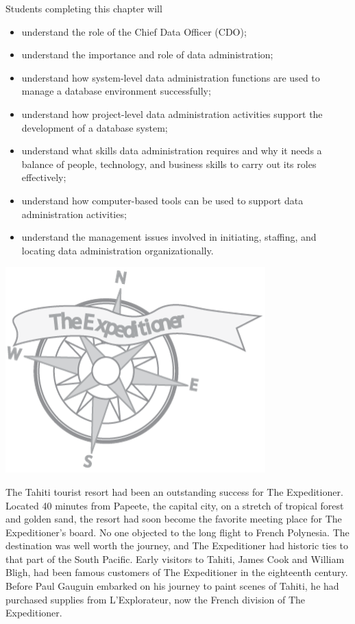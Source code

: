 \documentclass[
]{article}
\begin{document}
Students completing this chapter will

\begin{itemize}
\item
  understand the role of the Chief Data Officer (CDO);
\item
  understand the importance and role of data administration;
\item
  understand how system-level data administration functions are used
  to manage a database environment successfully;
\item
  understand how project-level data administration activities support
  the development of a database system;
\item
  understand what skills data administration requires and why it needs
  a balance of people, technology, and business skills to carry out
  its roles effectively;
\item
  understand how computer-based tools can be used to support data
  administration activities;
\item
  understand the management issues involved in initiating, staffing,
  and locating data administration organizationally.
\end{itemize}

\includegraphics{Figures/Chapter 1/expeditioner.png}

The Tahiti tourist resort had been an outstanding success for The
Expeditioner. Located 40 minutes from Papeete, the capital city, on a
stretch of tropical forest and golden sand, the resort had soon become
the favorite meeting place for The Expeditioner's board. No one objected
to the long flight to French Polynesia. The destination was well worth
the journey, and The Expeditioner had historic ties to that part of the
South Pacific. Early visitors to Tahiti, James Cook and William Bligh,
had been famous customers of The Expeditioner in the eighteenth century.
Before Paul Gauguin embarked on his journey to paint scenes of Tahiti,
he had purchased supplies from L'Explorateur, now the French division of
The Expeditioner.
\end{document}
